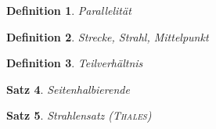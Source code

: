 \documentclass[%
a4paper,
11pt,		%
twoside,
]
{scrartcl}
\theoremstyle{plain}
\newtheorem{mydef}{Definition}[section]
\theoremstyle{plain}
\newtheorem{mysatz}[mydef]{Satz}
\theoremstyle{plain}
\theoremstyle{plain}
\theoremstyle{plain}
\begin{document}
\begin{mydef}
    Parallelität
\end{mydef}

\begin{mydef}
    Strecke, Strahl, Mittelpunkt
\end{mydef}

\begin{mydef}
    Teilverhältnis
\end{mydef}

\begin{mysatz}
    Seitenhalbierende
\end{mysatz}

\begin{mysatz}
    Strahlensatz (\textsc{Thales})
\end{mysatz}

\newpage
\end{document}
